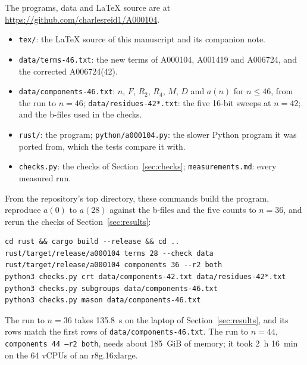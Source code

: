 \documentclass[11pt]{a000104}
\numberwithin{equation}{section}
\begin{document}
The programs, data and \LaTeX{} source are at \url{https://github.com/charlesreid1/A000104}.
\begin{itemize}
  \item \texttt{tex/}: the \LaTeX{} source of this manuscript and its companion note.
  \item \texttt{data/terms-46.txt}: the new terms of A000104, A001419 and A006724, and the corrected A006724(42).
  \item \texttt{data/components-46.txt}: $n$, $F$, $R_2$, $R_4$, $M$, $D$ and $a(n)$ for $n \le 46$, from the run to $n = 46$; \texttt{data/residues-42*.txt}: the five 16-bit sweeps at $n = 42$; and the b-files used in the checks.
  \item \texttt{rust/}: the program; \texttt{python/a000104.py}: the slower Python program it was ported from, which the tests compare it with.
  \item \texttt{checks.py}: the checks of Section~\ref{sec:checks}; \texttt{measurements.md}: every measured run.
\end{itemize}
From the repository's top directory, these commands build the program, reproduce $a(0)$ to $a(28)$ against the b-files and the five counts to $n = 36$, and rerun the checks of Section~\ref{sec:results}:
\begin{verbatim}
cd rust && cargo build --release && cd ..
rust/target/release/a000104 terms 28 --check data
rust/target/release/a000104 components 36 --r2 both
python3 checks.py crt data/components-42.txt data/residues-42*.txt
python3 checks.py subgroups data/components-46.txt
python3 checks.py mason data/components-46.txt
\end{verbatim}
The run to $n = 36$ takes 135.8~s on the laptop of Section~\ref{sec:results}, and its rows match the first rows of \texttt{data/components-46.txt}.
The run to $n = 44$, \texttt{components 44 --r2 both}, needs about 185~GiB of memory; it took 2~h 16~min on the 64 vCPUs of an r8g.16xlarge.

\printreferences
\end{document}
